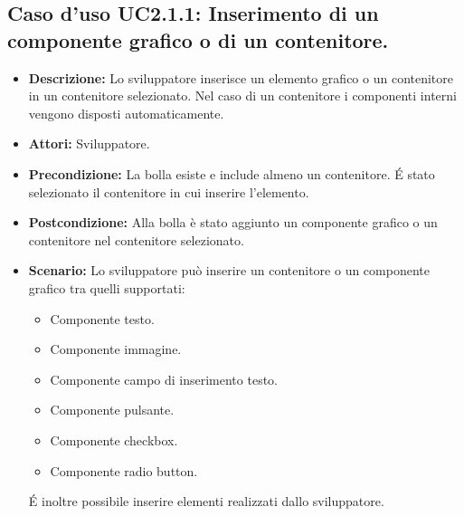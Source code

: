 \subsection{Caso d'uso UC2.1.1: Inserimento di un componente grafico o di un contenitore.}
\begin{itemize}
\item[]\textbf{Descrizione:} Lo sviluppatore inserisce un elemento grafico o un contenitore in un contenitore selezionato. Nel caso di un contenitore i componenti interni vengono disposti automaticamente.
\item[]\textbf{Attori:} Sviluppatore. 
\item[]\textbf{Precondizione:} La bolla esiste e include almeno un contenitore. \'E stato selezionato il contenitore in cui inserire l'elemento. 
\item[]\textbf{Postcondizione:} Alla bolla è stato aggiunto un componente grafico o un contenitore nel contenitore selezionato. 
\item[]\textbf{Scenario:}
 Lo sviluppatore può inserire un contenitore o un componente grafico tra quelli supportati: \begin{itemize}
\item Componente testo.
\item Componente immagine.
\item Componente campo di inserimento testo.
\item Componente pulsante.
\item Componente checkbox.
\item Componente radio button. \end{itemize} \'E inoltre possibile inserire elementi realizzati dallo sviluppatore. 
\end{itemize}

\clearpage

